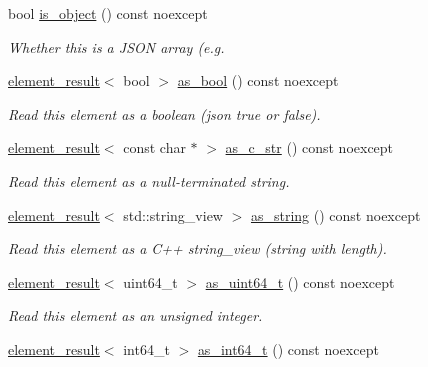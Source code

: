 \begin{DoxyCompactItemize}
bool \hyperlink{classsimdjson_1_1document_1_1element_abd705b50a8571a6e36fe53c83133cd2b}{is\+\_\+object} () const noexcept
\begin{DoxyCompactList}\small\item\em Whether this is a J\+S\+ON array (e.\+g. \end{DoxyCompactList}\item 
\hyperlink{classsimdjson_1_1document_1_1element__result}{element\+\_\+result}$<$ bool $>$ \hyperlink{classsimdjson_1_1document_1_1element_a6df6ba7eee788af715ffd494edfa860e}{as\+\_\+bool} () const noexcept
\begin{DoxyCompactList}\small\item\em Read this element as a boolean (json {\ttfamily true} or {\ttfamily false}). \end{DoxyCompactList}\item 
\hyperlink{classsimdjson_1_1document_1_1element__result}{element\+\_\+result}$<$ const char $\ast$ $>$ \hyperlink{classsimdjson_1_1document_1_1element_ae3df9bdbad4492c1c19b11c66c5e61be}{as\+\_\+c\+\_\+str} () const noexcept
\begin{DoxyCompactList}\small\item\em Read this element as a null-\/terminated string. \end{DoxyCompactList}\item 
\hyperlink{classsimdjson_1_1document_1_1element__result}{element\+\_\+result}$<$ std\+::string\+\_\+view $>$ \hyperlink{classsimdjson_1_1document_1_1element_a2467d0f9e039451767947dab82622331}{as\+\_\+string} () const noexcept
\begin{DoxyCompactList}\small\item\em Read this element as a C++ string\+\_\+view (string with length). \end{DoxyCompactList}\item 
\hyperlink{classsimdjson_1_1document_1_1element__result}{element\+\_\+result}$<$ uint64\+\_\+t $>$ \hyperlink{classsimdjson_1_1document_1_1element_ab89d449ae4c78aced06643d7323cbdfb}{as\+\_\+uint64\+\_\+t} () const noexcept
\begin{DoxyCompactList}\small\item\em Read this element as an unsigned integer. \end{DoxyCompactList}\item 
\hyperlink{classsimdjson_1_1document_1_1element__result}{element\+\_\+result}$<$ int64\+\_\+t $>$ \hyperlink{classsimdjson_1_1document_1_1element_ad02cc5dbfb8ae3d5309f8456759120e7}{as\+\_\+int64\+\_\+t} () const noexcept

\end{DoxyCompactItemize}
